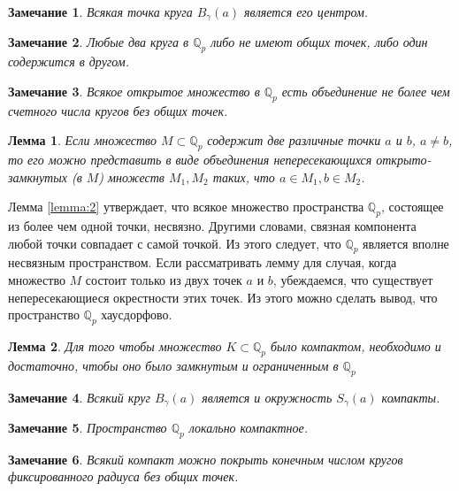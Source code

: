 \documentclass[master, och, diploma, times]{sty/SCWorks}
\theoremstyle{plain}
\newtheorem{lemma}{Лемма}[section]
\newtheorem{note}{Замечание}[section]
\theoremstyle{definition}
\numberwithin{equation}{section}
\begin{document}
\begin{note}
Всякая точка круга $B_{\gamma}(a)$ является его центром.
\end{note}

\begin{note}
Любые два круга в $\mathbb {Q}_p$ либо не имеют общих точек, либо один содержится в другом.
\end{note}

\begin{note}
Всякое открытое множество в $\mathbb {Q}_p$ есть объединение не более чем счетного числа кругов без общих точек.
\end{note}

\begin{lemma} \label{lemma:2}
Если множество $M \subset \mathbb {Q}_p$ содержит две различные точки $a$ и $b$, $a \ne b$, то его можно представить в виде объединения непересекающихся открыто-замкнутых (в $M$) множеств $M_1, M_2$ таких, что $a \in M_1, b \in M_2$\cite{bib:kozirev:2008}.
\end{lemma}

Лемма \eqref{lemma:2} утверждает, что всякое множество пространства $\mathbb {Q}_p$, состоящее из более чем одной точки, несвязно. Другими словами, связная компонента любой точки совпадает с самой точкой. Из этого следует, что $\mathbb {Q}_p$ является вполне несвязным пространством. Если рассматривать лемму для случая, когда множество $M$ состоит только из двух точек $a$ и $b$, убеждаемся, что существует непересекающиеся окрестности этих точек. Из этого можно сделать вывод, что пространство $\mathbb {Q}_p$ хаусдорфово.

\begin{lemma}
Для того чтобы множество $K \subset \mathbb {Q}_p$ было компактом, необходимо и достаточно, чтобы оно было замкнутым и ограниченным в $\mathbb {Q}_p$
\end{lemma}

\begin{note}
Всякий круг $B_{\gamma}(a)$ является и окружность $S_{\gamma}(a)$ компакты.
\end{note}

\begin{note}
Пространство $\mathbb {Q}_p$ локально компактное.
\end{note}

\begin{note}
Всякий компакт можно покрыть конечным числом кругов фиксированного радиуса без общих точек.
\end{note}
\end{document}
